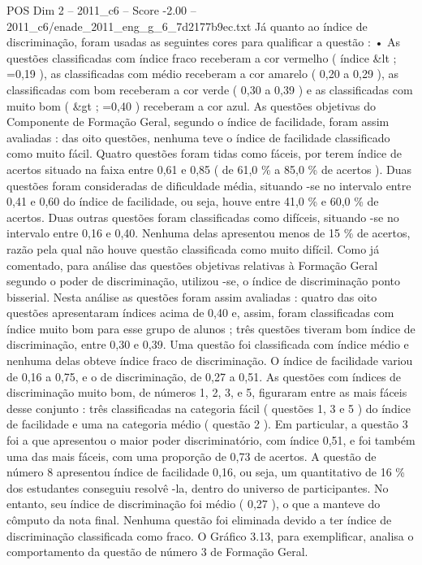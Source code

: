 \begin{textsample}{POS Dim 2 – 2011\_c6 – Score -2.00 – 2011\_c6/enade\_2011\_eng\_g\_6\_7d2177b9ec.txt}
Já quanto ao índice de discriminação, foram usadas as seguintes cores para qualificar a questão : • As questões classificadas com índice fraco receberam a cor vermelho ( índice \&lt ; =0,19 ), as classificadas com médio receberam a cor amarelo ( 0,20 a 0,29 ), as classificadas com bom receberam a cor verde ( 0,30 a 0,39 ) e as classificadas com muito bom ( \&gt ; =0,40 ) receberam a cor azul.
As questões objetivas do Componente de Formação Geral, segundo o índice de facilidade, foram assim avaliadas : das oito questões, nenhuma teve o índice de facilidade classificado como muito fácil.
Quatro questões foram tidas como fáceis, por terem índice de acertos situado na faixa entre 0,61 e 0,85 ( de 61,0 \% a 85,0 \% de acertos ).
Duas questões foram consideradas de dificuldade média, situando -se no intervalo entre 0,41 e 0,60 do índice de facilidade, ou seja, houve entre 41,0 \% e 60,0 \% de acertos.
Duas outras questões foram classificadas como difíceis, situando -se no intervalo entre 0,16 e 0,40.
Nenhuma delas apresentou menos de 15 \% de acertos, razão pela qual não houve questão classificada como muito difícil.
Como já comentado, para análise das questões objetivas relativas à Formação Geral segundo o poder de discriminação, utilizou -se, o índice de discriminação ponto bisserial.
Nesta análise as questões foram assim avaliadas : quatro das oito questões apresentaram índices acima de 0,40 e, assim, foram classificadas com índice muito bom para esse grupo de alunos ; três questões tiveram bom índice de discriminação, entre 0,30 e 0,39.
Uma questão foi classificada com índice médio e nenhuma delas obteve índice fraco de discriminação.
O índice de facilidade variou de 0,16 a 0,75, e o de discriminação, de 0,27 a 0,51.
As questões com índices de discriminação muito bom, de números 1, 2, 3, e 5, figuraram entre as mais fáceis desse conjunto : três classificadas na categoria fácil ( questões 1, 3 e 5 ) do índice de facilidade e uma na categoria médio ( questão 2 ).
Em particular, a questão 3 foi a que apresentou o maior poder discriminatório, com índice 0,51, e foi também uma das mais fáceis, com uma proporção de 0,73 de acertos.
A questão de número 8 apresentou índice de facilidade 0,16, ou seja, um quantitativo de 16 \% dos estudantes conseguiu resolvê -la, dentro do universo de participantes.
No entanto, seu índice de discriminação foi médio ( 0,27 ), o que a manteve do cômputo da nota final.
Nenhuma questão foi eliminada devido a ter índice de discriminação classificada como fraco.
O Gráfico 3.13, para exemplificar, analisa o comportamento da questão de número 3 de Formação Geral.

\end{textsample}
